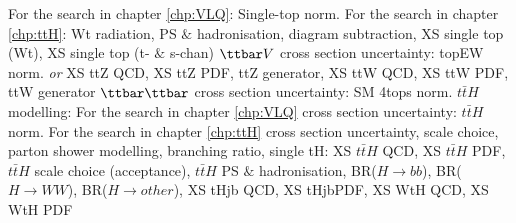 \bi
\ib For the search in chapter \ref{chp:VLQ}: Single-top norm. 
\ib For the search in chapter \ref{chp:ttH}: Wt radiation, PS $\&$ hadronisation, diagram subtraction, XS single top (Wt), XS single top (t- $\&$ s-chan)
\ei 
\ib $\ttbar V$ cross section uncertainty: topEW norm. \emph{or} XS ttZ QCD, XS ttZ PDF, ttZ generator, XS ttW QCD, XS ttW PDF, ttW generator 
\ib $\ttbar\ttbar$ cross section uncertainty: SM 4tops norm.
\ib $t\bar{t}H$ modelling:
\bi
\ib For the search in chapter \ref{chp:VLQ} cross section uncertainty: $t\bar{t}H$ norm.
\ib For the search in chapter \ref{chp:ttH} cross section uncertainty, scale choice, parton shower modelling, branching ratio, single tH: XS $t\bar{t}H$ QCD, XS $t\bar{t}H$ PDF, $t\bar{t}H$ scale choice (acceptance), $t\bar{t}H$ PS $\&$ hadronisation, BR($H\to bb$), BR($H\to WW$), BR($H\to other$), XS tHjb QCD, XS tHjbPDF, XS WtH QCD, XS WtH PDF
\ei
\ei


\ei
